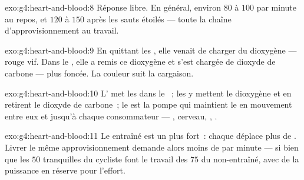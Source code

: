 \begin{solution}{exo:g4:heart-and-blood:8}
Réponse libre. En général, environ $80$ à $100$  par
minute au repos, et $120$ à $150$ après les sauts étoilés --- toute
la chaîne d'approvisionnement au travail.
\end{solution}

\begin{solution}{exo:g4:heart-and-blood:9}
En quittant les , elle venait de charger du dioxygène ---
rouge vif. Dans le , elle a remis ce dioxygène et s'est
chargée de dioxyde de carbone --- plus foncée. La couleur suit la
cargaison.
\end{solution}

\begin{solution}{exo:g4:heart-and-blood:10}
L' met les  dans le ~; les  y
mettent le dioxygène et en retirent le dioxyde de carbone~; le 
est la pompe qui maintient le  en mouvement entre eux et jusqu'à
chaque consommateur --- , cerveau, , .
\end{solution}

\begin{solution}{exo:g4:heart-and-blood:11}
Le  entraîné est un  plus fort~: chaque  déplace
plus de . Livrer le même approvisionnement demande alors moins
de  par minute --- si bien que les $50$ tranquilles du
cycliste font le travail des $75$ du non-entraîné, avec de la
puissance en réserve pour l'effort.
\end{solution}

